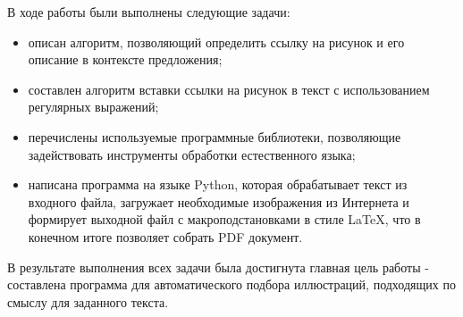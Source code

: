 \conclusion
В ходе работы были выполнены следующие задачи:

\begin{itemize}
    \item описан алгоритм, позволяющий определить ссылку на рисунок и его
    описание в контексте предложения;
    \item составлен алгоритм вставки ссылки на рисунок в текст с использованием
    регулярных выражений;
    \item перечислены используемые программные библиотеки, позволяющие
    задействовать инструменты обработки естественного языка;
    \item написана программа на языке Python, которая обрабатывает текст из
    входного файла, загружает необходимые изображения из Интернета и формирует
    выходной файл с макроподстановками в стиле LaTeX, что в конечном итоге
    позволяет собрать PDF документ.
\end{itemize}

В результате выполнения всех задачи была достигнута главная цель работы -
составлена программа для автоматического подбора иллюстраций, подходящих по
смыслу для заданного текста.